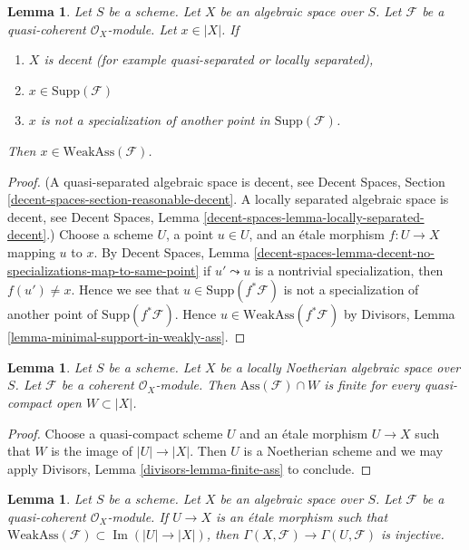 \documentclass{stacks-project}
\theoremstyle{plain}
\newtheorem{lemma}[subsection]{Lemma}
\theoremstyle{definition}
\theoremstyle{remark}
\numberwithin{equation}{subsection}
\def\Im{\mathop{\mathrm{Im}}}
\begin{document}
\begin{lemma}
\label{lemma-minimal-support-in-weakly-ass-decent}
Let $S$ be a scheme. Let $X$ be an algebraic space over $S$.
Let $\mathcal{F}$ be a quasi-coherent $\mathcal{O}_X$-module.
Let $x \in |X|$. If
\begin{enumerate}
\item $X$ is decent (for example quasi-separated or locally separated),
\item $x \in \text{Supp}(\mathcal{F})$
\item $x$ is not a specialization of another point in
$\text{Supp}(\mathcal{F})$.
\end{enumerate}
Then $x \in \text{WeakAss}(\mathcal{F})$.
\end{lemma}

\begin{proof}
(A quasi-separated algebraic space is decent, see
Decent Spaces, Section \ref{decent-spaces-section-reasonable-decent}.
A locally separated algebraic space is decent, see
Decent Spaces, Lemma \ref{decent-spaces-lemma-locally-separated-decent}.)
Choose a scheme $U$, a point $u \in U$, and an \'etale morphism
$f : U \to X$ mapping $u$ to $x$. By
Decent Spaces, Lemma
\ref{decent-spaces-lemma-decent-no-specializations-map-to-same-point}
if $u' \leadsto u$ is a nontrivial specialization, then
$f(u') \not = x$. Hence we see that $u \in \text{Supp}(f^*\mathcal{F})$
is not a specialization of another point of
$\text{Supp}(f^*\mathcal{F})$.
Hence $u \in \text{WeakAss}(f^*\mathcal{F})$ by
Divisors, Lemma \ref{lemma-minimal-support-in-weakly-ass}.
\end{proof}

\begin{lemma}
\label{lemma-finite-ass}
Let $S$ be a scheme. Let $X$ be a locally Noetherian algebraic space over $S$.
Let $\mathcal{F}$ be a coherent $\mathcal{O}_X$-module.
Then $\text{Ass}(\mathcal{F}) \cap W$ is finite for
every quasi-compact open $W \subset |X|$.
\end{lemma}

\begin{proof}
Choose a quasi-compact scheme $U$ and an \'etale morphism $U \to X$
such that $W$ is the image of $|U| \to |X|$. Then $U$ is a
Noetherian scheme and we may apply
Divisors, Lemma \ref{divisors-lemma-finite-ass} to conclude.
\end{proof}

\begin{lemma}
\label{lemma-restriction-injective-open-contains-weakly-ass}
Let $S$ be a scheme. Let $X$ be an algebraic space over $S$.
Let $\mathcal{F}$ be a quasi-coherent $\mathcal{O}_X$-module.
If $U \to X$ is an \'etale morphism such that
$\text{WeakAss}(\mathcal{F}) \subset \Im(|U| \to |X|)$, then
$\Gamma(X, \mathcal{F}) \to \Gamma(U, \mathcal{F})$ is injective.
\end{lemma}
\end{document}
